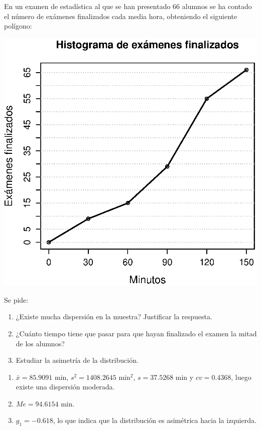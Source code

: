 {En un examen de estadística al que se han presentado 66 alumnos se ha contado el número de exámenes finalizados cada media hora, obteniendo el siguiente polígono:
\begin{center}
\includegraphics[scale=0.8]{img/poligono-des-56}
\end{center}
Se pide:
\begin{enumerate}
\item ¿Existe mucha dispersión en la muestra? Justificar la respuesta.
\item ¿Cuánto tiempo tiene que pasar para que hayan finalizado el examen la mitad de los alumnos?
\item Estudiar la asimetría de la distribución.  
\end{enumerate}
}
{\begin{enumerate}
\item $\bar x= 85.9091$ min, $s^2 =1408.2645$ min$^2$, $s= 37.5268$ min y $cv= 0.4368$, luego existe una dispersión moderada.
\item $Me = 94.6154$ min.
\item $g_1= -0.618$, lo que indica que la distribución es asimétrica hacia la izquierda. 
\end{enumerate}
}
